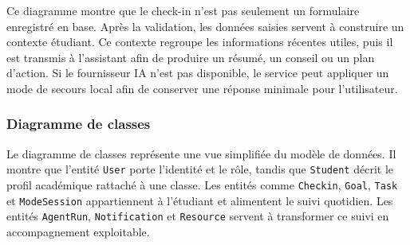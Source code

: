 \documentclass{rapportENSET}
\begin{document}
Ce diagramme montre que le check-in n'est pas seulement un formulaire enregistré en base. Après la validation, les données saisies servent à construire un contexte étudiant. Ce contexte regroupe les informations récentes utiles, puis il est transmis à l'assistant afin de produire un résumé, un conseil ou un plan d'action. Si le fournisseur IA n'est pas disponible, le service peut appliquer un mode de secours local afin de conserver une réponse minimale pour l'utilisateur.

\subsubsection{Diagramme de classes}
Le diagramme de classes représente une vue simplifiée du modèle de données. Il montre que l'entité \texttt{User} porte l'identité et le rôle, tandis que \texttt{Student} décrit le profil académique rattaché à une classe. Les entités comme \texttt{Checkin}, \texttt{Goal}, \texttt{Task} et \texttt{ModeSession} appartiennent à l'étudiant et alimentent le suivi quotidien. Les entités \texttt{AgentRun}, \texttt{Notification} et \texttt{Resource} servent à transformer ce suivi en accompagnement exploitable.
\end{document}
